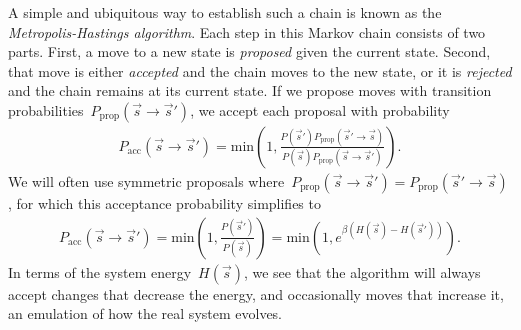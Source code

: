 A simple and ubiquitous way to establish such a chain is known as the \emph{Metropolis-Hastings algorithm}. Each step in this Markov chain consists of two parts. First, a move to a new state is \emph{proposed} given the current state. Second, that move is either \emph{accepted} and the chain moves to the new state, or it is \emph{rejected} and the chain remains at its current state. If we propose moves with transition probabilities~$P_{\text{prop}}(\vec{s} \rightarrow \vec{s}')$, we accept each proposal with probability \begin{align}
    P_{\text{acc}}(\vec{s} \rightarrow \vec{s}') = \text{min}\left(1, \frac{P(\vec{s}')P_{\text{prop}}(\vec{s}' \rightarrow \vec{s})}{P(\vec{s})P_{\text{prop}}(\vec{s} \rightarrow \vec{s}')}\right).
\end{align}
We will often use symmetric proposals where~$P_{\text{prop}}(\vec{s} \rightarrow \vec{s}') = P_{\text{prop}}(\vec{s}' \rightarrow \vec{s})$, for which this acceptance probability simplifies to \begin{align}
    P_{\text{acc}}(\vec{s} \rightarrow \vec{s}') = \text{min}\left(1, \frac{P(\vec{s}')}{P(\vec{s})}\right) = \text{min}\left(1, e^{\beta(H(\vec{s}) - H(\vec{s}'))}\right).
\end{align} 
In terms of the system energy~$H(\vec{s})$, we see that the algorithm will always accept changes that decrease the energy, and occasionally moves that increase it, an emulation of how the real system evolves.

